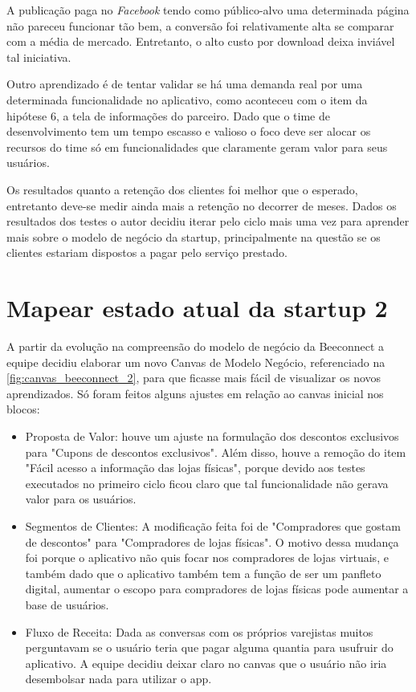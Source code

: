 A publicação paga no \textit{Facebook} tendo como público-alvo uma determinada página não pareceu funcionar tão bem, a conversão foi relativamente alta se comparar com a média de mercado. Entretanto, o alto custo por download deixa inviável tal iniciativa.

Outro aprendizado é de tentar validar se há uma demanda real por uma determinada funcionalidade no aplicativo, como aconteceu com o item da hipótese 6, a tela de informações do parceiro. Dado que o time de desenvolvimento tem um tempo escasso e valioso o foco deve ser alocar os recursos do time só em funcionalidades que claramente geram valor para seus usuários.

Os resultados quanto a retenção dos clientes foi melhor que o esperado, entretanto deve-se medir ainda mais a retenção no decorrer de meses. Dados os resultados dos testes o autor decidiu iterar pelo ciclo mais uma vez para aprender mais sobre o modelo de negócio da startup, principalmente na questão se os clientes estariam dispostos a pagar pelo serviço prestado.

\section{Mapear estado atual da startup 2}
\label{cha:mapear_estado_2}
A partir da evolução na compreensão do modelo de negócio da Beeconnect a equipe decidiu elaborar um novo Canvas de Modelo Negócio, referenciado na \autoref{fig:canvas_beeconnect_2}, para que ficasse mais fácil de visualizar os novos aprendizados. Só foram feitos alguns ajustes em relação ao canvas inicial nos blocos:

\begin{itemize}
\item Proposta de Valor: houve um ajuste na formulação dos descontos exclusivos para "Cupons de descontos exclusivos". Além disso, houve a remoção do item "Fácil acesso a informação das lojas físicas", porque devido aos testes executados no primeiro ciclo ficou claro que tal funcionalidade não gerava valor para os usuários.
\item Segmentos de Clientes: A modificação feita foi de "Compradores que gostam de descontos" para "Compradores de lojas físicas". O motivo dessa mudança foi porque o aplicativo não quis focar nos compradores de lojas virtuais, e também dado que o aplicativo também tem a função de ser um panfleto digital, aumentar o escopo para compradores de lojas físicas pode aumentar a base de usuários.
\item Fluxo de Receita: Dada as conversas com os próprios varejistas muitos perguntavam se o usuário teria que pagar alguma quantia para usufruir do aplicativo. A equipe decidiu deixar claro no canvas que o usuário não iria desembolsar nada para utilizar o app.
\end{itemize}

